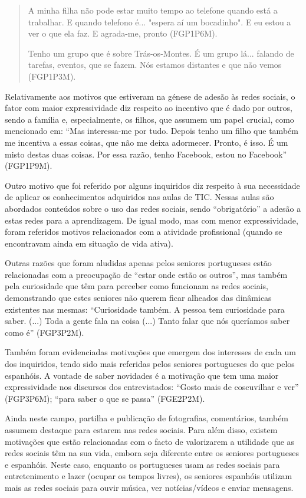 \documentclass[portuguese]{textolivre}
\begin{document}
\begin{quote}
A minha filha não pode estar muito tempo ao telefone quando está a trabalhar. E quando telefono é... "espera aí um bocadinho". E eu estou a ver o que ela faz. E agrada-me, pronto (FGP1P6M).


Tenho um grupo que é sobre Trás-os-Montes. É um grupo lá... falando de tarefas, eventos, que se fazem. Nós estamos distantes e que não vemos (FGP1P3M).
\end{quote}

Relativamente aos motivos que estiveram na génese de adesão às redes sociais, o fator com maior expressividade diz respeito ao incentivo que é dado por outros, sendo a família e, especialmente, os filhos, que assumem um papel crucial, como mencionado em: “Mas interessa-me por tudo. Depois tenho um filho que também me incentiva a essas coisas, que não me deixa adormecer. Pronto, é isso. É um misto destas duas coisas. Por essa razão, tenho Facebook, estou no Facebook” (FGP1P9M).

Outro motivo que foi referido por alguns inquiridos diz respeito à sua necessidade de aplicar os conhecimentos adquiridos nas aulas de TIC. Nessas aulas são abordados conteúdos sobre o uso das redes sociais, sendo “obrigatório” a adesão a estas redes para a aprendizagem. De igual modo, mas com menor expressividade, foram referidos motivos relacionados com a atividade profissional (quando se encontravam ainda em situação de vida ativa).

Outras razões que foram aludidas apenas pelos seniores portugueses estão relacionadas com a preocupação de “estar onde estão os outros”, mas também pela curiosidade que têm para perceber como funcionam as redes sociais, demonstrando que estes seniores não querem ficar alheados das dinâmicas existentes nas mesmas: “Curiosidade também. A pessoa tem curiosidade para saber. (...) Toda a gente fala na coisa (...) Tanto falar que nós queríamos saber como é” (FGP3P2M).

Também foram evidenciadas motivações que emergem dos interesses de cada um dos inquiridos, tendo sido mais referidas pelos seniores portugueses do que pelos espanhóis. A vontade de saber novidades é a motivação que tem uma maior expressividade nos discursos dos entrevistados: “Gosto mais de coscuvilhar e ver” (FGP3P6M); “para saber o que se passa” (FGE2P2M).

Ainda neste campo, partilha e publicação de fotografias, comentários, também assumem destaque para estarem nas redes sociais. Para além disso, existem motivações que estão relacionadas com o facto de valorizarem a utilidade que as redes sociais têm na sua vida, embora seja diferente entre os seniores portugueses e espanhóis. Neste caso, enquanto os portugueses usam as redes sociais para entretenimento e lazer (ocupar os tempos livres), os seniores espanhóis utilizam mais as redes sociais para ouvir música, ver notícias/vídeos e enviar mensagens.
\end{document}
